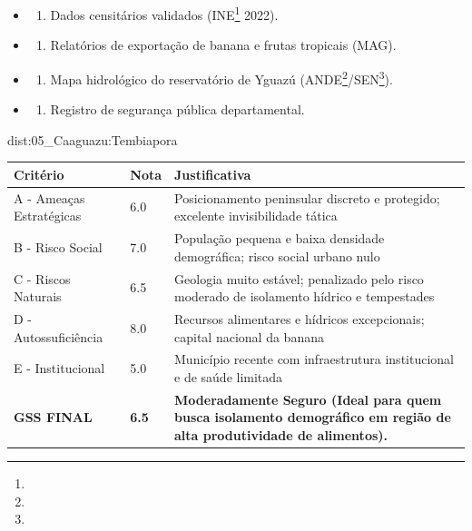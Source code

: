 {\begin{itemize}
\tightlist
\item
  \begin{enumerate}
  \def\labelenumi{\arabic{enumi})}
  \tightlist
  \item
    Dados censitários validados (INE\footnote{\fineINE} 2022).
  \end{enumerate}
\item
  \begin{enumerate}
  \def\labelenumi{\arabic{enumi})}
  \setcounter{enumi}{1}
  \tightlist
  \item
    Relatórios de exportação de banana e frutas tropicais (MAG).
  \end{enumerate}
\item
  \begin{enumerate}
  \def\labelenumi{\arabic{enumi})}
  \setcounter{enumi}{2}
  \tightlist
  \item
    Mapa hidrológico do reservatório de Yguazú (ANDE\footnote{\fineANDE}/\allowbreak SEN\footnote{\fineSEN}).
  \end{enumerate}
\item
  \begin{enumerate}
  \def\labelenumi{\arabic{enumi})}
  \setcounter{enumi}{3}
  \tightlist
  \item
    Registro de segurança pública departamental.
  \end{enumerate}
\end{itemize}}{dist:05_Caaguazu:Tembiapora}
\begin{table}[ht!]
\small \begin{tabular}{p{3.0cm}p{0.8cm}p{6.0cm}} \toprule
\textbf{Critério} & \textbf{Nota} & \textbf{Justificativa} \\ \midrule
A - Ameaças Estratégicas & 6.0 & Posicionamento peninsular discreto e protegido; excelente invisibilidade tática \\
B - Risco Social & 7.0 & População pequena e baixa densidade demográfica; risco social urbano nulo \\
C - Riscos Naturais & 6.5 & Geologia muito estável; penalizado pelo risco moderado de isolamento hídrico e tempestades \\
D - Autossuficiência & 8.0 & Recursos alimentares e hídricos excepcionais; capital nacional da banana \\
E - Institucional & 5.0 & Município recente com infraestrutura institucional e de saúde limitada \\
\midrule \textbf{GSS FINAL} & \textbf{6.5} & \textbf{Moderadamente Seguro (Ideal para quem busca isolamento demográfico em região de alta produtividade de alimentos).} \\ \bottomrule \end{tabular}
\end{table}
